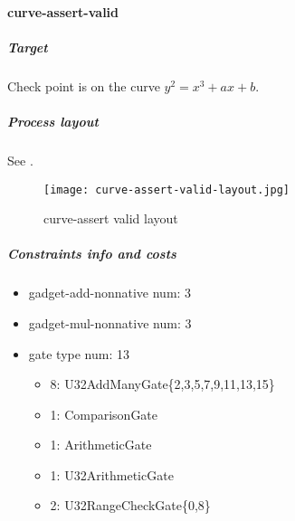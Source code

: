 \paragraph{curve-assert-valid}

\subparagraph{Target}
Check point is on the curve $y^2 = x^3 + ax + b$.

\subparagraph{Process layout}
See .
\begin{figure}[!ht]
    \centering
    \texttt{[image: curve-assert-valid-layout.jpg]}
    \caption{curve-assert valid layout}
    \label{fig:curve-assert-valid-layout}
\end{figure}

\subparagraph{Constraints info and costs}
\begin{itemize}
    \item gadget-add-nonnative num: 3
    \item gadget-mul-nonnative num: 3
    \item gate type num: 13
        \begin{itemize}
            \item 8: U32AddManyGate\{2,3,5,7,9,11,13,15\}
            \item 1: ComparisonGate
            \item 1: ArithmeticGate
            \item 1: U32ArithmeticGate
            \item 2: U32RangeCheckGate\{0,8\}
        \end{itemize}
\end{itemize}
